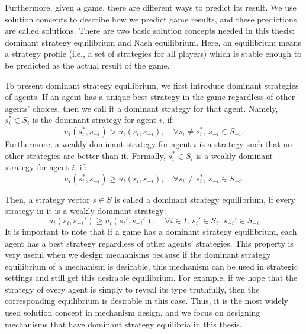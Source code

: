 \documentclass[11pt]{phdthesis}
\begin{document}


Furthermore, given a game, there are different ways to predict its result. We use solution concepts to describe how we predict game results, and these predictions are called solutions. There are two basic solution concepts needed in this thesis: dominant strategy equilibrium and Nash equilibrium. Here, an equilibrium means a strategy profile (i.e., a set of strategies for all players) which is stable enough to be predicted as the actual result of the game. 

To present dominant strategy equilibrium, we first introduce dominant strategies of agents. If an agent has a unique best strategy in the game regardless of other agents' choices, then we call it a dominant strategy for that agent. Namely, $s_i^* \in S_i$ is the dominant strategy for agent $i$, if: \[u_i(s_i^*,s_{-i}) > u_i(s_i,s_{-i}),\quad  \forall s_i \neq s_i^* ,\,  s_{-i} \in S_{-i}.\]
Furthermore, a weakly dominant strategy for agent $i$ is a strategy such that no other strategies are better than it. Formally, $s_i^* \in S_i$ is a weakly dominant strategy for agent $i$, if: 
\[u_i(s_i^*,s_{-i}) \geq u_i(s_i,s_{-i}),\quad \forall s_i \neq s_i^* ,\,  s_{-i} \in S_{-i}.\] 

Then, a strategy vector $ s \in S $ is called a dominant strategy equilibrium, if every strategy in it is a weakly dominant strategy:
\[u_i(s_i,s_{-i}') \geq u_i(s_i',s_{-i}'),\quad \forall  i \in I ,\, s_i' \in S_i,\, s_{-i}' \in S_{-i}\] 
It is important to note that if a game has a dominant strategy equilibrium, each agent has a best strategy regardless of other agents' strategies. This property is very useful when we design mechanisms because if the dominant strategy equilibrium of a mechanism is desirable, this mechanism can be used in strategic settings and still get this desirable equilibrium. For example, if we hope that the strategy of every agent is simply to reveal its type truthfully, then the corresponding equilibrium is desirable in this case. Thus, it is the most widely used solution concept in mechanism design, and we focus on designing mechanisms that have dominant strategy equilibria in this thesis. 
\end{document}
